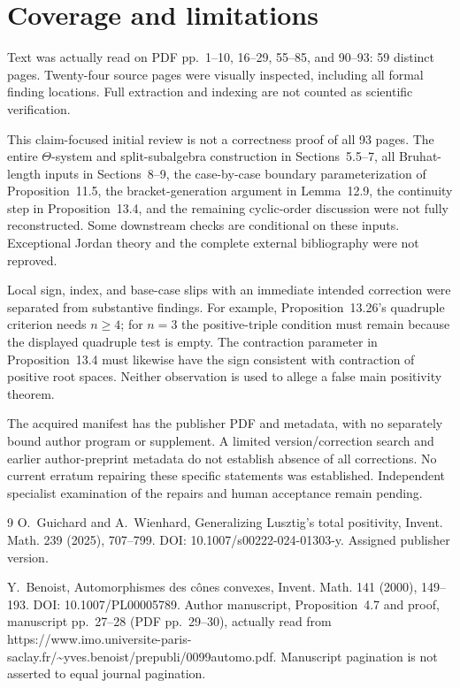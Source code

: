 \documentclass[10pt]{article}
\begin{document}
\section*{Coverage and limitations}
Text was actually read on PDF pp. 1–10, 16–29, 55–85, and 90–93: 59 distinct pages. Twenty-four source pages were visually inspected, including all formal finding locations. Full extraction and indexing are not counted as scientific verification.\par
This claim-focused initial review is not a correctness proof of all 93 pages. The entire \(\Theta\)-system and split-subalgebra construction in Sections 5.5–7, all Bruhat-length inputs in Sections 8–9, the case-by-case boundary parameterization of Proposition 11.5, the bracket-generation argument in Lemma 12.9, the continuity step in Proposition 13.4, and the remaining cyclic-order discussion were not fully reconstructed. Some downstream checks are conditional on these inputs. Exceptional Jordan theory and the complete external bibliography were not reproved.\par
Local sign, index, and base-case slips with an immediate intended correction were separated from substantive findings. For example, Proposition 13.26’s quadruple criterion needs \(n\geq4\); for \(n=3\) the positive-triple condition must remain because the displayed quadruple test is empty. The contraction parameter in Proposition 13.4 must likewise have the sign consistent with contraction of positive root spaces. Neither observation is used to allege a false main positivity theorem.\par
The acquired manifest has the publisher PDF and metadata, with no separately bound author program or supplement. A limited version/correction search and earlier author-preprint metadata do not establish absence of all corrections. No current erratum repairing these specific statements was established. Independent specialist examination of the repairs and human acceptance remain pending.\par
9 O. Guichard and A. Wienhard, Generalizing Lusztig’s total positivity, Invent. Math. 239 (2025), 707–799. DOI: 10.1007/s00222-024-01303-y. Assigned publisher version.\par
Y. Benoist, Automorphismes des cônes convexes, Invent. Math. 141 (2000), 149–193. DOI: 10.1007/PL00005789. Author manuscript, Proposition 4.7 and proof, manuscript pp. 27–28 (PDF pp. 29–30), actually read from https://www.imo.universite-paris-saclay.fr/\textasciitilde{}yves.benoist/prepubli/0099automo.pdf. Manuscript pagination is not asserted to equal journal pagination.\par
\end{document}
